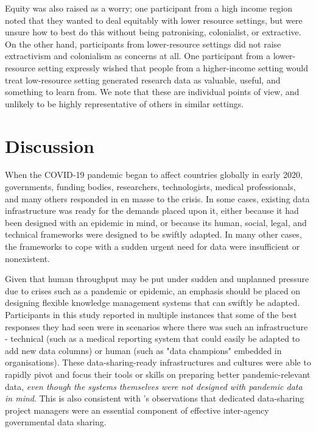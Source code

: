 \documentclass{CUP-JNL-DAP}%
\begin{document}
Equity was also raised as a worry; one participant from a high income region noted that they wanted to deal equitably with lower resource settings, but were unsure how to best do this without being patronising, colonialist, or extractive. On the other hand, participants from lower-resource settings did not raise extractivism and colonialism  as concerns at all. One participant from a lower-resource setting expressly wished that people from a higher-income setting would treat low-resource setting generated research data as valuable, useful, and something to learn from. We note that these are individual points of view, and unlikely to be highly representative of others in similar settings. 

\section{Discussion}

When the COVID-19 pandemic began to affect countries globally in early 2020, governments, funding bodies, researchers, technologists, medical professionals, and many others responded in en masse to the crisis. In some cases, existing data infrastructure was ready for the demands placed upon it, either because it had been designed with an epidemic in mind, or because its human, social, legal, and technical frameworks were designed to be swiftly adapted. In many other cases, the frameworks to cope with a sudden urgent need for data were insufficient or nonexistent. 

Given that human throughput may be put under sudden and unplanned pressure due to crises such as a pandemic or epidemic, an emphasis should be placed on designing flexible knowledge management systems that can swiftly be adapted. Participants in this study reported in multiple instances that some of the best responses they had seen were in scenarios where there was such an infrastructure - technical (such as a medical reporting system that could easily be adapted to add new data columns) or human (such as "data champions" embedded in organisations). These data-sharing-ready infrastructures and cultures were able to rapidly pivot and focus their tools or skills on preparing better pandemic-relevant data, \textit{even though the systems themselves were not designed with pandemic data in mind}. This is also consistent with \cite{gil-garcia_government_2016}'s observations that dedicated data-sharing project managers were an essential component of effective inter-agency governmental data sharing.
\end{document}
